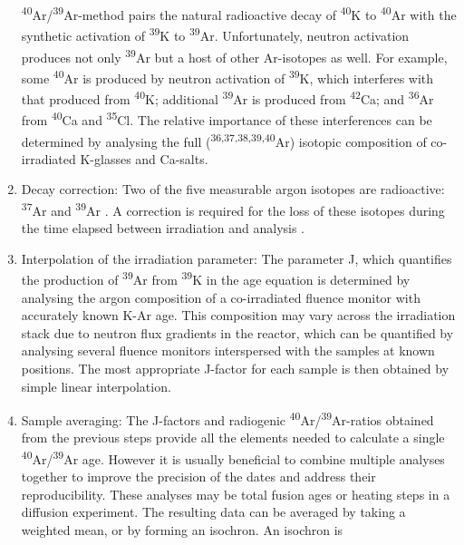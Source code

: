 \documentclass{article}
\begin{document}
\begin{enumerate}
  \textsuperscript{40}Ar/\textsuperscript{39}Ar-method pairs the
  natural radioactive decay of \textsuperscript{40}K to
  \textsuperscript{40}Ar with the synthetic activation of
  \textsuperscript{39}K to \textsuperscript{39}Ar. Unfortunately,
  neutron activation produces not only \textsuperscript{39}Ar but a
  host of other Ar-isotopes as well. For example, some
  \textsuperscript{40}Ar is produced by neutron activation of
  \textsuperscript{39}K, which interferes with that produced from
  \textsuperscript{40}K; additional \textsuperscript{39}Ar is produced
  from \textsuperscript{42}Ca; and \textsuperscript{36}Ar from
  \textsuperscript{40}Ca and \textsuperscript{35}Cl. The relative
  importance of these interferences can be determined by analysing the
  full (\textsuperscript{36,37,38,39,40}Ar) isotopic composition of
  co-irradiated K-glasses and Ca-salts.
\item Decay correction: Two of the five measurable argon isotopes are
  radioactive: \textsuperscript{37}Ar \citep[t$_{1∕2} = 34.95 \pm
    0.08$ days,][]{renne2001} and \textsuperscript{39}Ar
  \citep[t$_{1∕2} = 269 \pm 3$ years,][]{stoenner1965}. A correction
  is required for the loss of these isotopes during the time elapsed
  between irradiation and analysis \citep{wijbrans1986}.
\item Interpolation of the irradiation parameter: The parameter J,
  which quantifies the production of \textsuperscript{39}Ar from
  \textsuperscript{39}K in the age equation is determined by analysing
  the argon composition of a co-irradiated fluence monitor with
  accurately known K-Ar age. This composition may vary across the
  irradiation stack due to neutron flux gradients in the reactor,
  which can be quantified by analysing several fluence monitors
  interspersed with the samples at known positions. The most
  appropriate J-factor for each sample is then obtained by simple
  linear interpolation.
\item\label{it:isochron} Sample averaging: The J-factors and
  radiogenic \textsuperscript{40}Ar/\textsuperscript{39}Ar-ratios
  obtained from the previous steps provide all the elements needed to
  calculate a single \textsuperscript{40}Ar/\textsuperscript{39}Ar
  age.  However it is usually beneficial to combine multiple analyses
  together to improve the precision of the dates and address their
  reproducibility. These analyses may be total fusion ages or heating
  steps in a diffusion experiment. The resulting data can be averaged
  by taking a weighted mean, or by forming an isochron. An isochron is

\end{enumerate}
\end{document}
